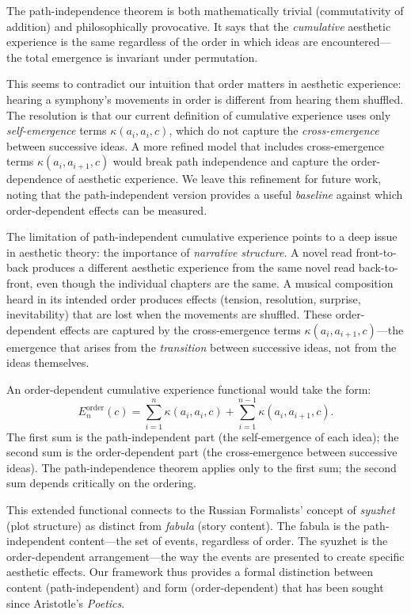 \begin{interpretation}
\label{int:path-independence}
The path-independence theorem is both mathematically trivial (commutativity
of addition) and philosophically provocative.  It says that the
\emph{cumulative} aesthetic experience is the same regardless of the order
in which ideas are encountered---the total emergence is invariant under
permutation.

This seems to contradict our intuition that order matters in aesthetic
experience: hearing a symphony's movements in order is different from
hearing them shuffled.  The resolution is that our current definition of
cumulative experience uses only \emph{self-emergence} terms
$\kappa(a_i, a_i, c)$, which do not capture the \emph{cross-emergence}
between successive ideas.  A more refined model that includes
cross-emergence terms $\kappa(a_i, a_{i+1}, c)$ would break path
independence and capture the order-dependence of aesthetic experience.
We leave this refinement for future work, noting that the path-independent
version provides a useful \emph{baseline} against which order-dependent
effects can be measured.
\end{interpretation}

\begin{remark}
\label{rem:order-dependent}
The limitation of path-independent cumulative experience points to a deep issue in aesthetic theory: the importance of \emph{narrative structure}.  A novel read front-to-back produces a different aesthetic experience from the same novel read back-to-front, even though the individual chapters are the same.  A musical composition heard in its intended order produces effects (tension, resolution, surprise, inevitability) that are lost when the movements are shuffled.  These order-dependent effects are captured by the cross-emergence terms $\kappa(a_i, a_{i+1}, c)$---the emergence that arises from the \emph{transition} between successive ideas, not from the ideas themselves.

An order-dependent cumulative experience functional would take the form:
\[
  E^{\mathrm{order}}_n(c) = \sum_{i=1}^{n} \kappa(a_i, a_i, c) + \sum_{i=1}^{n-1} \kappa(a_i, a_{i+1}, c).
\]
The first sum is the path-independent part (the self-emergence of each idea); the second sum is the order-dependent part (the cross-emergence between successive ideas).  The path-independence theorem applies only to the first sum; the second sum depends critically on the ordering.

This extended functional connects to the Russian Formalists' concept of \emph{syuzhet} (plot structure) as distinct from \emph{fabula} (story content).  The fabula is the path-independent content---the set of events, regardless of order.  The syuzhet is the order-dependent arrangement---the way the events are presented to create specific aesthetic effects.  Our framework thus provides a formal distinction between content (path-independent) and form (order-dependent) that has been sought since Aristotle's \textit{Poetics}.
\end{remark}

